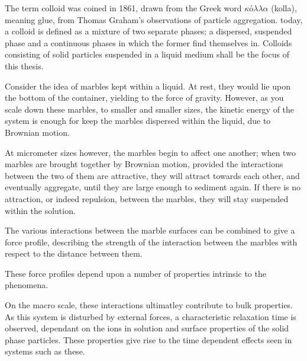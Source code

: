 The term colloid was coined in 1861, drawn from the Greek word $κόλλα$ (kolla), meaning glue, from Thomas Graham's observations of particle aggregation\cite{old_colloid}. %
today, a colloid is defined as %
a mixture of two separate phases; a dispersed, suspended phase and a continuous%
phases in which the former find themselves in. %
Colloids consisting of solid particles suspended in a liquid medium shall be the focus of this thesis.\cite{review_colloid1}

Consider the idea of marbles kept within a liquid. At rest, they would lie upon the bottom of the container, yielding to the force of gravity\cite{Neuton}. However, as you scale down these marbles, to smaller and smaller sizes, the kinetic energy of the system is enough for keep the marbles dispersed within the liquid, due to Brownian motion\cite{Brown}.

At micrometer sizes however, the marbles begin to affect one another; when two marbles are brought together by Brownian motion, provided the interactions between the two of them are attractive, they will attract towards each other, and eventually aggregate, until they are large enough to sediment again. If there is no attraction, or indeed repulsion, between the marbles, they will stay suspended within the solution.


The various interactions between the marble surfaces can be combined to give a force profile, describing the strength of the interaction between the marbles with respect to the distance between them.

These force profiles depend upon a number of %
properties intrinsic to the phenomena. %


On the macro scale, these interactions %
ultimatley contribute to bulk properties. As this system is disturbed by external forces, a 
characteristic relaxation time is observed, dependant on the ions in solution and surface properties of the solid phase particles. %
These properties give rise to the %
time dependent effects seen in systems such as these.

